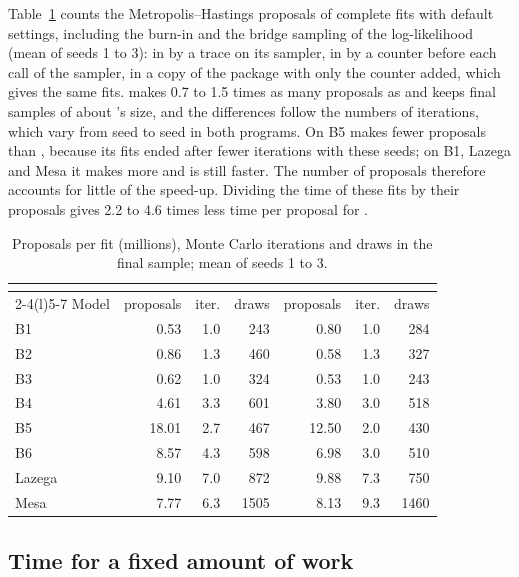 Table~\ref{tab:spdprops} counts the Metropolis--Hastings proposals of complete fits with default settings, including the burn-in and the bridge sampling of the log-likelihood (mean of seeds 1 to 3): in \ergm{} by a trace on its sampler, in \nwergm{} by a counter before each call of the sampler, in a copy of the package with only the counter added, which gives the same fits. \nwergm{} makes 0.7 to 1.5 times as many proposals as \ergm{} and keeps final samples of about \ergm{}'s size, and the differences follow the numbers of iterations, which vary from seed to seed in both programs. On B5 \nwergm{} makes fewer proposals than \ergm{}, because its fits ended after fewer iterations with these seeds; on B1, Lazega and Mesa it makes more and is still faster. The number of proposals therefore accounts for little of the speed-up. Dividing the time of these fits by their proposals gives 2.2 to 4.6 times less time per proposal for \nwergm{}.

\begin{table}[htbp]
\centering\small
\caption{Proposals per fit (millions), Monte Carlo iterations and draws in the final sample; mean of seeds 1 to 3.}\label{tab:spdprops}
\begin{tabular}{@{}lrrrrrr@{}}
\toprule
& \multicolumn{3}{c}{\ergm{}} & \multicolumn{3}{c}{\nwergm{}}\\
\cmidrule(lr){2-4}\cmidrule(l){5-7}
Model & proposals & iter. & draws & proposals & iter. & draws\\
\midrule
B1 & 0.53 & 1.0 & 243 & 0.80 & 1.0 & 284\\
B2 & 0.86 & 1.3 & 460 & 0.58 & 1.3 & 327\\
B3 & 0.62 & 1.0 & 324 & 0.53 & 1.0 & 243\\
B4 & 4.61 & 3.3 & 601 & 3.80 & 3.0 & 518\\
B5 & 18.01 & 2.7 & 467 & 12.50 & 2.0 & 430\\
B6 & 8.57 & 4.3 & 598 & 6.98 & 3.0 & 510\\
Lazega & 9.10 & 7.0 & 872 & 9.88 & 7.3 & 750\\
Mesa & 7.77 & 6.3 & 1505 & 8.13 & 9.3 & 1460\\
\bottomrule
\end{tabular}
\end{table}

\subsection{Time for a fixed amount of work}\label{sec:samest-workload}

